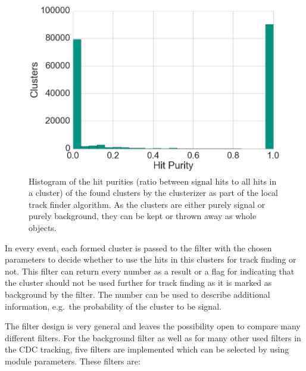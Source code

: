\begin{figure}
  \centering
  \includegraphics[width=0.7\linewidth]{figures/workflow/cluster_purity.png}
  \caption{Histogram of the hit purities (ratio between signal hits to all hits in a cluster) of the found clusters by the clusterizer as part of the local track finder algorithm. As the clusters are either purely signal or purely background, they can be kept or thrown away as whole objects.}
  \label{fig-cluster-hit-purity}
\end{figure}

In every event, each formed cluster is passed to the filter with the chosen parameters to decide whether to use the hits in this clusters for track finding or not. This filter can return every number as a result or a flag for indicating that the cluster should not be used further for track finding as it is marked as background by the filter. The number can be used to describe additional information, e.g.\ the probability of the cluster to be signal.

The filter design is very general and leaves the possibility open to compare many different filters. For the background filter as well as for many other used filters in the CDC tracking, five filters are implemented which can be selected by using module parameters. These filters are:

